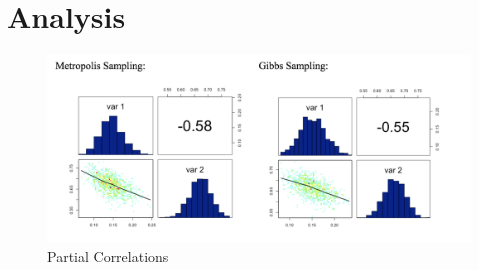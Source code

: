 \documentclass[11pt,a4paper]{article}
\begin{document}


\section*{Analysis}
\begin{figure}[h!]
  \includegraphics[scale=0.8]{images/correlation.png}
  \caption{Partial Correlations}
  \label{fig:birds}
\end{figure}
\end{document}
